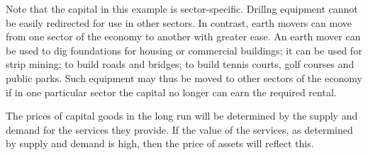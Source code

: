 Note that the capital in this example is sector-specific. Drillng
equipment cannot be easily redirected for use in other sectors. In contrast,
earth movers can move from one sector of the economy to another with
greater ease. An earth mover can be used to dig foundations for
housing or commercial buildings; it can be used for strip mining; to build
roads and bridges; to build tennis courts, golf courses and public parks.
Such equipment may thus be moved to other sectors of the economy if in one
particular sector the capital no longer can earn the required rental.

The prices of capital goods in the long run will be determined by the supply
and demand for the services they provide. If the value of the services, as
determined by supply and demand is high, then the price of assets will
reflect this.